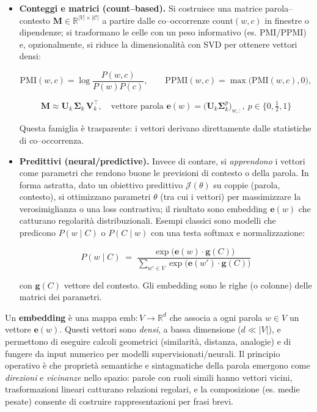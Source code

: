         \begin{itemize}
        
            \item\textbf{Conteggi e matrici (count–based).} Si costruisce una matrice parola–contesto $\mathbf{M}\in\mathbb{R}^{|V|\times|\mathcal{C}|}$ a partire dalle co–occorrenze $\mathrm{count}(w,c)$ in finestre o dipendenze; si trasformano le celle con un peso informativo (es. PMI/PPMI) e, opzionalmente, si riduce la dimensionalità con SVD per ottenere vettori densi:
            
            $$
            \mathrm{PMI}(w,c)=\log\frac{P(w,c)}{P(w)P(c)},\qquad \mathrm{PPMI}(w,c)=\max\big(\mathrm{PMI}(w,c),0\big),
            $$
            
            $$ \mathbf{M}\approx\mathbf{U}_k\,\mathbf{\Sigma}_k\,\mathbf{V}_k^{\top},\quad \text{vettore parola } \mathbf{e}(w)=\big(\mathbf{U}_k\mathbf{\Sigma}_k^{p}\big)_{w,:},\ p\in\{0,\tfrac12,1\}
            $$
        
            Questa famiglia è trasparente: i vettori derivano direttamente dalle statistiche di co–occorrenza.
        
            \item\textbf{Predittivi (neural/predictive).} Invece di contare, si \emph{apprendono} i vettori come parametri che rendono buone le previsioni di contesto o della parola. In forma astratta, dato un obiettivo predittivo $\mathcal{J}(\theta)$ su coppie (parola, contesto), si ottimizzano parametri $\theta$ (tra cui i vettori) per massimizzare la verosimiglianza o una loss contrastiva; il risultato sono embedding $\mathbf{e}(w)$ che catturano regolarità distribuzionali. Esempi classici sono modelli che predicono $P(w\mid C)$ o $P(C\mid w)$ con una testa softmax e normalizzazione:
            
            $$
            P(w\mid C)\;=\;\frac{\exp\big(\mathbf{e}(w)\cdot\mathbf{g}(C)\big)}{\sum_{w'\in V}\exp\big(\mathbf{e}(w')\cdot\mathbf{g}(C)\big)}
            $$
        
            con $\mathbf{g}(C)$ vettore del contesto. Gli embedding sono le righe (o colonne) delle matrici dei parametri.
        
        \end{itemize}
        
        Un \textbf{embedding} è una mappa $\mathrm{emb}: V \to \mathbb{R}^d$ che associa a ogni parola $w\in V$ un vettore $\mathbf{e}(w)$. Questi vettori sono \emph{densi}, a bassa dimensione ($d\ll |V|$), e permettono di eseguire calcoli geometrici (similarità, distanza, analogie) e di fungere da input numerico per modelli supervisionati/neurali. Il principio operativo è che proprietà semantiche e sintagmatiche della parola emergono come \emph{direzioni} e \emph{vicinanze} nello spazio: parole con ruoli simili hanno vettori vicini, trasformazioni lineari catturano relazioni regolari, e la composizione (es. medie pesate) consente di costruire rappresentazioni per frasi brevi.\\
